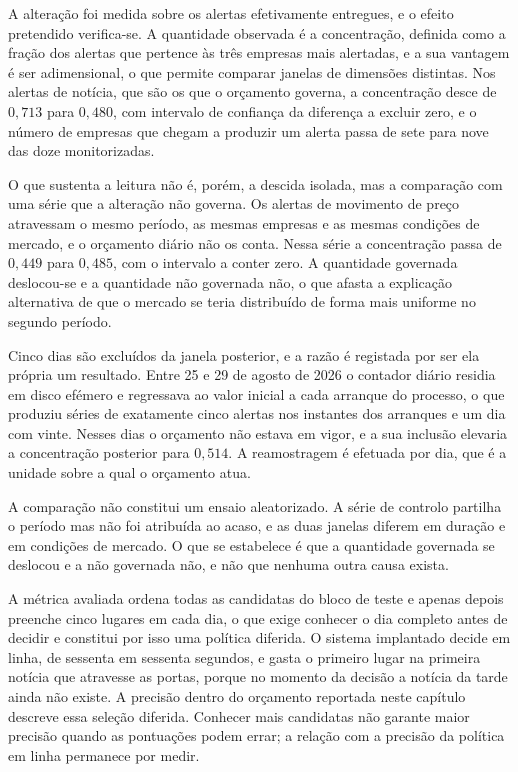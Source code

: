 A alteração foi medida sobre os alertas efetivamente entregues, e o efeito pretendido
verifica-se. A quantidade observada é a concentração, definida como a fração dos alertas que
pertence às três empresas mais alertadas, e a sua vantagem é ser adimensional, o que permite
comparar janelas de dimensões distintas. Nos alertas de notícia, que são os que o orçamento
governa, a concentração desce de $0{,}713$ para $0{,}480$, com intervalo de confiança da
diferença a excluir zero, e o número de empresas que chegam a produzir um alerta passa de sete
para nove das doze monitorizadas.

O que sustenta a leitura não é, porém, a descida isolada, mas a comparação com uma série que a
alteração não governa. Os alertas de movimento de preço atravessam o mesmo período, as mesmas
empresas e as mesmas condições de mercado, e o orçamento diário não os conta. Nessa série a
concentração passa de $0{,}449$ para $0{,}485$, com o intervalo a conter zero. A quantidade
governada deslocou-se e a quantidade não governada não, o que afasta a explicação alternativa
de que o mercado se teria distribuído de forma mais uniforme no segundo período.

Cinco dias são excluídos da janela posterior, e a razão é registada por ser ela própria um
resultado. Entre 25 e 29 de agosto de 2026 o contador diário residia em disco efémero e
regressava ao valor inicial a cada arranque do processo, o que produziu séries de exatamente
cinco alertas nos instantes dos arranques e um dia com vinte. Nesses dias o orçamento não estava
em vigor, e a sua inclusão elevaria a concentração posterior para $0{,}514$. A reamostragem é
efetuada por dia, que é a unidade sobre a qual o orçamento atua.

A comparação não constitui um ensaio aleatorizado. A série de controlo partilha o período mas não
foi atribuída ao acaso, e as duas janelas diferem em duração e em condições de mercado. O que se
estabelece é que a quantidade governada se deslocou e a não governada não, e não que nenhuma
outra causa exista.

A métrica avaliada ordena todas as candidatas do bloco de
teste e apenas depois preenche cinco lugares em cada dia, o que exige conhecer o dia completo antes
de decidir e constitui por isso uma política diferida. O sistema implantado decide em linha, de
sessenta em sessenta segundos, e gasta o primeiro lugar na primeira notícia que atravesse as portas,
porque no momento da decisão a notícia da tarde ainda não existe. A precisão dentro do orçamento
reportada neste capítulo descreve essa seleção diferida. Conhecer mais candidatas não garante maior
precisão quando as pontuações podem errar; a relação com a precisão da política em linha permanece
por medir.

